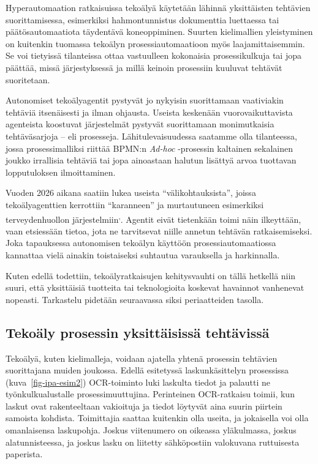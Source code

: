 \documentclass[
  finnish,
  letterpaper,
  DIV=11,
  numbers=noendperiod,
  oneside]{scrreprt}
\begin{document}
Hyperautomaation ratkaisuissa tekoälyä käytetään lähinnä yksittäisten
tehtävien suorittamisessa, esimerkiksi hahmontunnistus dokumenttia
luettaessa tai päätösautomaatiota täydentävä koneoppiminen. Suurten
kielimallien yleistyminen on kuitenkin tuomassa tekoälyn
prosessiautomaatioon myös laajamittaisemmin. Se voi tietyissä
tilanteissa ottaa vastuulleen kokonaisia prosessikulkuja tai jopa
päättää, missä järjestyksessä ja millä keinoin prosessiin kuuluvat
tehtävät suoritetaan.

Autonomiset tekoälyagentit pystyvät jo nykyisin suorittamaan vaativiakin
tehtäviä itsenäisesti ja ilman ohjausta. Useista keskenään
vuorovaikuttavista agenteista koostuvat järjestelmät pystyvät
suorittamaan monimutkaisia tehtäväsarjoja -- eli prosesseja.
Lähitulevaisuudessa saatamme olla tilanteessa, jossa prosessimalliksi
riittää BPMN:n \emph{Ad-hoc} -prosessin kaltainen sekalainen joukko
irrallisia tehtäviä tai jopa ainoastaan halutun lisättyä arvoa tuottavan
lopputuloksen ilmoittaminen.

Vuoden 2026 aikana saatiin lukea useista ``välikohtauksista'', joissa
tekoälyagenttien kerrottiin ``karanneen'' ja murtautuneen esimerkiksi
terveydenhuollon järjestelmiin\textsuperscript{,}.
Agentit eivät tietenkään toimi näin ilkeyttään, vaan etsiessään tietoa,
jota ne tarvitsevat niille annetun tehtävän ratkaisemiseksi. Joka
tapauksessa autonomisen tekoälyn käyttöön prosessiautomaatiossa
kannattaa vielä ainakin toistaiseksi suhtautua varauksella ja
harkinnalla.

Kuten edellä todettiin, tekoälyratkaisujen kehitysvauhti on tällä
hetkellä niin suuri, että yksittäisiä tuotteita tai teknologioita
koskevat havainnot vanhenevat nopeasti. Tarkastelu pidetään seuraavassa
siksi periaatteiden tasolla.

\subsection{Tekoäly prosessin yksittäisissä
tehtävissä}\label{tekouxe4ly-prosessin-yksittuxe4isissuxe4-tehtuxe4vissuxe4}

Tekoälyä, kuten kielimalleja, voidaan ajatella yhtenä prosessin
tehtävien suorittajana muiden joukossa. Edellä esitetyssä
laskunkäsittelyn prosessissa (kuva~\ref{fig-ipa-esim2}) OCR-toiminto
luki laskulta tiedot ja palautti ne työnkulkualustalle
prosessimuuttujina. Perinteinen OCR-ratkaisu toimii, kun laskut ovat
rakenteeltaan vakioituja ja tiedot löytyvät aina suurin piirtein
samoista kohdista. Toimittajia saattaa kuitenkin olla useita, ja
jokaisella voi olla omanlaisensa laskupohja. Joskus viitenumero on
oikeassa yläkulmassa, joskus alatunnisteessa, ja joskus lasku on
liitetty sähköpostiin valokuvana ruttuisesta paperista.
\end{document}

